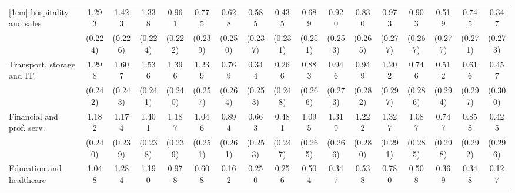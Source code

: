 {\begin{tabular}{l*{16}{c}}
[1em]
hospitality and sales&       1.293\sym{***}&       1.423\sym{***}&       1.338\sym{***}&       0.961\sym{***}&       0.775\sym{**} &       0.628\sym{*}  &       0.585\sym{*}  &       0.435         &       0.689\sym{**} &       0.920\sym{***}&       0.830\sym{**} &       0.973\sym{***}&       0.903\sym{***}&       0.519         &       0.745\sym{**} &       0.347         \\
                    &     (0.224)         &     (0.226)         &     (0.224)         &     (0.222)         &     (0.239)         &     (0.250)         &     (0.237)         &     (0.231)         &     (0.251)         &     (0.253)         &     (0.265)         &     (0.277)         &     (0.267)         &     (0.277)         &     (0.271)         &     (0.273)         \\
[1em]
Transport, storage and IT.&       1.298\sym{***}&       1.607\sym{***}&       1.536\sym{***}&       1.396\sym{***}&       1.239\sym{***}&       0.769\sym{**} &       0.344         &       0.266         &       0.883\sym{***}&       0.946\sym{***}&       0.949\sym{***}&       1.202\sym{***}&       0.746\sym{**} &       0.512         &       0.616\sym{*}  &       0.457         \\
                    &     (0.242)         &     (0.243)         &     (0.241)         &     (0.240)         &     (0.257)         &     (0.264)         &     (0.253)         &     (0.248)         &     (0.266)         &     (0.273)         &     (0.282)         &     (0.297)         &     (0.286)         &     (0.294)         &     (0.297)         &     (0.300)         \\
[1em]
Financial and prof. serv.&       1.182\sym{***}&       1.174\sym{***}&       1.401\sym{***}&       1.187\sym{***}&       1.046\sym{***}&       0.894\sym{***}&       0.663\sym{**} &       0.481         &       1.095\sym{***}&       1.319\sym{***}&       1.222\sym{***}&       1.327\sym{***}&       1.087\sym{***}&       0.747\sym{*}  &       0.858\sym{**} &       0.425         \\
                    &     (0.240)         &     (0.239)         &     (0.238)         &     (0.239)         &     (0.251)         &     (0.261)         &     (0.253)         &     (0.247)         &     (0.265)         &     (0.266)         &     (0.280)         &     (0.291)         &     (0.285)         &     (0.298)         &     (0.292)         &     (0.296)         \\
[1em]
Education and healthcare&       1.048\sym{***}&       1.284\sym{***}&       1.190\sym{***}&       0.978\sym{***}&       0.608\sym{*}  &       0.162         &       0.250         &       0.256         &       0.504         &       0.347         &       0.538         &       0.780\sym{*}  &       0.508         &       0.369         &       0.348         &       0.127         \\

\end{tabular}}
